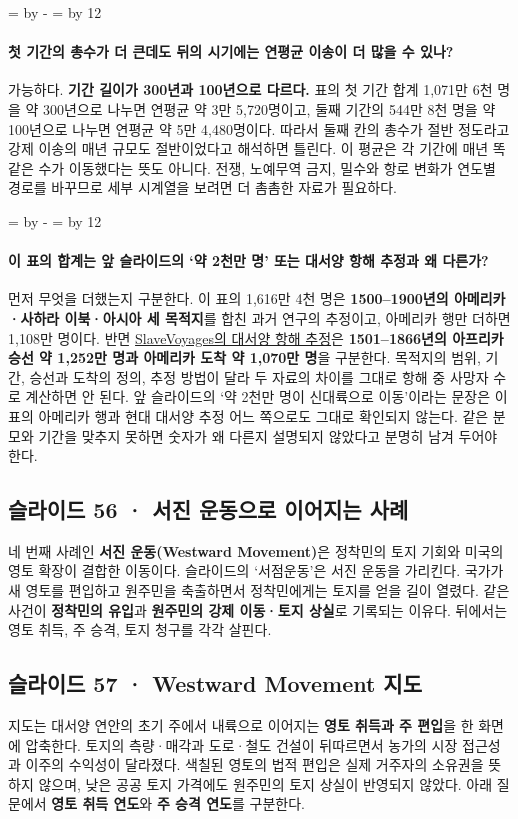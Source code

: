 \documentclass[10pt,a4paper]{article}
\newcommand{\ReserveQuestionSpace}{%
  \par\begingroup
  \dimen0=\pagegoal \advance\dimen0 by -\pagetotal
  \dimen2=\baselineskip \multiply\dimen2 by 12
  \ifdim\dimen0<\dimen2 \newpage\fi
  \endgroup}
\begin{document}
\ReserveQuestionSpace
\paragraph{첫 기간의 총수가 더 큰데도 뒤의 시기에는 연평균 이송이 더 많을 수 있나?}
가능하다. \textbf{기간 길이가 300년과 100년으로 다르다.} 표의 첫 기간 합계 1,071만 6천 명을 약 300년으로 나누면 연평균 약 3만 5,720명이고, 둘째 기간의 544만 8천 명을 약 100년으로 나누면 연평균 약 5만 4,480명이다. 따라서 둘째 칸의 총수가 절반 정도라고 강제 이송의 매년 규모도 절반이었다고 해석하면 틀린다. 이 평균은 각 기간에 매년 똑같은 수가 이동했다는 뜻도 아니다. 전쟁, 노예무역 금지, 밀수와 항로 변화가 연도별 경로를 바꾸므로 세부 시계열을 보려면 더 촘촘한 자료가 필요하다.\par

\ReserveQuestionSpace
\paragraph{이 표의 합계는 앞 슬라이드의 ‘약 2천만 명’ 또는 대서양 항해 추정과 왜 다른가?}
먼저 무엇을 더했는지 구분한다. 이 표의 1,616만 4천 명은 \textbf{1500–1900년의 아메리카·사하라 이북·아시아 세 목적지}를 합친 과거 연구의 추정이고, 아메리카 행만 더하면 1,108만 명이다. 반면 \href{https://www.slavevoyages.org/assessment/estimates}{SlaveVoyages의 대서양 항해 추정}은 \textbf{1501–1866년의 아프리카 승선 약 1,252만 명과 아메리카 도착 약 1,070만 명}을 구분한다. 목적지의 범위, 기간, 승선과 도착의 정의, 추정 방법이 달라 두 자료의 차이를 그대로 항해 중 사망자 수로 계산하면 안 된다. 앞 슬라이드의 ‘약 2천만 명이 신대륙으로 이동’이라는 문장은 이 표의 아메리카 행과 현대 대서양 추정 어느 쪽으로도 그대로 확인되지 않는다. 같은 분모와 기간을 맞추지 못하면 숫자가 왜 다른지 설명되지 않았다고 분명히 남겨 두어야 한다.\par

\subsection{슬라이드 56 · 서진 운동으로 이어지는 사례}
네 번째 사례인 \textbf{서진 운동(Westward Movement)}은 정착민의 토지 기회와 미국의 영토 확장이 결합한 이동이다. 슬라이드의 ‘서점운동’은 서진 운동을 가리킨다. 국가가 새 영토를 편입하고 원주민을 축출하면서 정착민에게는 토지를 얻을 길이 열렸다. 같은 사건이 \textbf{정착민의 유입}과 \textbf{원주민의 강제 이동·토지 상실}로 기록되는 이유다. 뒤에서는 영토 취득, 주 승격, 토지 청구를 각각 살핀다.\par

\subsection{슬라이드 57 · Westward Movement 지도}
지도는 대서양 연안의 초기 주에서 내륙으로 이어지는 \textbf{영토 취득과 주 편입}을 한 화면에 압축한다. 토지의 측량·매각과 도로·철도 건설이 뒤따르면서 농가의 시장 접근성과 이주의 수익성이 달라졌다. 색칠된 영토의 법적 편입은 실제 거주자의 소유권을 뜻하지 않으며, 낮은 공공 토지 가격에도 원주민의 토지 상실이 반영되지 않았다. 아래 질문에서 \textbf{영토 취득 연도}와 \textbf{주 승격 연도}를 구분한다.\par
\end{document}
